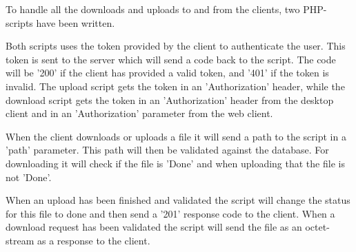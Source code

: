 To handle all the downloads and uploads to and from the clients, two PHP-scripts have been written. 

Both scripts uses the token provided by the client to authenticate the user. This token is sent to the server which will send a code back to the script. The code will be '200' if the client has provided a valid token, and '401' if the token is invalid. The upload script gets the token in an 'Authorization' header, while the download script gets the token in an 'Authorization' header from the desktop client and in an 'Authorization' parameter from the web client.

When the client downloads or uploads a file it will send a path to the script in a 'path' parameter. This path will then be validated against the database. For downloading it will check if the file is 'Done' and when uploading that the file is not 'Done'.

When an upload has been finished and validated the script will change the status for this file to done and then send a '201' response code to the client. When a download request has been validated the script will send the file as an octet-stream as a response to the client.
